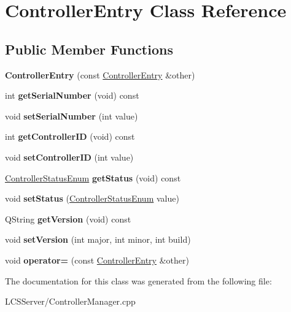 \hypertarget{class_controller_entry}{}\section{Controller\+Entry Class Reference}
\label{class_controller_entry}
\subsection*{Public Member Functions}
\begin{DoxyCompactItemize}
\item 
\mbox{\label{class_controller_entry_a26793ef5e3046aba4d50a10faf4a3d28}} 
{\bfseries Controller\+Entry} (const \hyperlink{class_controller_entry}{Controller\+Entry} \&other)
\item 
\mbox{\label{class_controller_entry_a4f1555d6fb93f644dbd4bb56af6e3db6}} 
int {\bfseries get\+Serial\+Number} (void) const
\item 
\mbox{\label{class_controller_entry_ada1605e856547eec003091a4c7ffffb1}} 
void {\bfseries set\+Serial\+Number} (int value)
\item 
\mbox{\label{class_controller_entry_a118aec7c94dfddb49a0c4753cd7fc482}} 
int {\bfseries get\+Controller\+ID} (void) const
\item 
\mbox{\label{class_controller_entry_ad25f5d4cd7c78d8bfaa94b6bd4930c1b}} 
void {\bfseries set\+Controller\+ID} (int value)
\item 
\mbox{\label{class_controller_entry_a5b981f25f7e3a9a50817a70959096766}} 
\hyperlink{_global_defs_8h_a51207b6a49e0da6f9978a3019d93480a}{Controller\+Status\+Enum} {\bfseries get\+Status} (void) const
\item 
\mbox{\label{class_controller_entry_a3b937ec9d808aacc509304ab0fa58959}} 
void {\bfseries set\+Status} (\hyperlink{_global_defs_8h_a51207b6a49e0da6f9978a3019d93480a}{Controller\+Status\+Enum} value)
\item 
\mbox{\label{class_controller_entry_ab3897317445003f2776d4c3ae54f621f}} 
Q\+String {\bfseries get\+Version} (void) const
\item 
\mbox{\label{class_controller_entry_a2eb241a6eacde27c5d2f23e71104f210}} 
void {\bfseries set\+Version} (int major, int minor, int build)
\item 
\mbox{\label{class_controller_entry_ab761e0059786897f281c3ef9d03d80fe}} 
void {\bfseries operator=} (const \hyperlink{class_controller_entry}{Controller\+Entry} \&other)
\end{DoxyCompactItemize}


The documentation for this class was generated from the following file\+:\begin{DoxyCompactItemize}
\item 
L\+C\+S\+Server/Controller\+Manager.\+cpp\end{DoxyCompactItemize}
